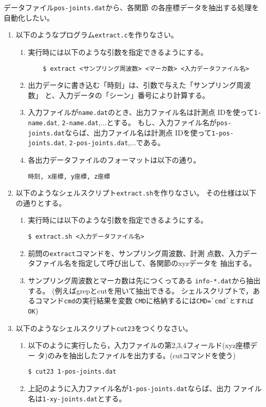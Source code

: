 \documentclass{jsarticle}
\begin{document}
データファイル\verb|pos-joints.dat|から、各関節
の各座標データを抽出する処理を自動化したい。
\begin{enumerate}
\item 以下のようなプログラム\verb|extract.c|を作りなさい。
  \begin{enumerate}
  \item 実行時には以下のような引数を指定できるようにする。
\begin{verbatim}
    $ extract <サンプリング周波数> <マーカ数> <入力データファイル名>
\end{verbatim}
  \item 出力データに書き込む「時刻」は、引数で与えた「サンプリング周波数」
    と、入力データの「シーン」番号により計算する。
  \item 入力ファイルが\verb|name.dat|のとき、出力ファイル名は計測点
    IDを使って\verb|1-name.dat|, \verb|2-name.dat|,...とする。
    もし、入力ファイル名が\verb|pos-joints.dat|ならば、出力ファイル名は計測点
    IDを使って\verb|1-pos-joints.dat|,
    \verb|2-pos-joints.dat|,...である。
  \item 各出力データファイルのフォーマットは以下の通り。
\begin{verbatim}
時刻, x座標, y座標, z座標
\end{verbatim}
  \end{enumerate}
\item  以下のようなシェルスクリプト\verb|extract.sh|を作りなさい。
  その仕様は以下の通りとする。
  \begin{enumerate}
  \item 実行時には以下のような引数を指定できるようにする。
\begin{verbatim}
$ extract.sh <入力データファイル名>
\end{verbatim}
  \item 前問の\verb|extract|コマンドを、サンプリング周波数、計測
    点数、入力データファイル名を指定して呼び出して、各関節のxyzデータを
    抽出する。
  \item サンプリング周波数とマーカ数は先につくってある
    \verb|info-*.dat|から抽出する。
    (例えばgrepとcutを用いて抽出できる。
    シェルスクリプトで，あるコマンド\verb|cmd|の実行結果を変数
    \verb|CMD|に格納するには\verb|CMD=`cmd`とすればOK|)

  \end{enumerate}
\item 以下のようなシェルスクリプト\verb|cut23|をつくりなさい。
\begin{enumerate}
\item 以下のように実行したら，入力ファイルの第2,3,4フィールド(xyz座標デー
  タ)のみを抽出したファイルを出力する。(cutコマンドを使う)
\begin{verbatim}
$ cut23 1-pos-joints.dat
\end{verbatim}
\item 上記のように入力ファイル名が\verb|1-pos-joints.dat|ならば、出力
  ファイル名は\verb|1-xy-joints.dat|とする。
\end{enumerate}
\end{enumerate}
\end{document}
